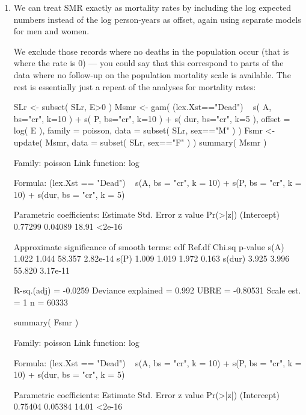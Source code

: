 \begin{enumerate}[resume]

  
  

\item We can treat SMR exactly as mortality rates by including the log
  expected numbers instead of the log person-years as offset, again using
  separate models for men and women. 
 
  We exclude those records where no deaths in the population occur
  (that is where the rate is 0) --- you could say that this correspond
  to parts of the data where no follow-up on the population mortality
  scale is available. The rest is essentially just a repeat of the
  analyses for mortality rates:
\begin{Schunk}
\begin{Sinput}
 SLr <- subset( SLr, E>0 )
 Msmr <- gam( (lex.Xst=="Dead") ~ s(   A, bs="cr", k=10 ) +
                                  s(   P, bs="cr", k=10 ) +
                                  s( dur, bs="cr", k=5 ),
               offset = log( E ),
               family = poisson,
                 data = subset( SLr, sex=="M" ) )
 Fsmr <- update( Msmr, 
                 data = subset( SLr, sex=="F" ) )
 summary( Msmr )
\end{Sinput}
\begin{Soutput}
Family: poisson 
Link function: log 

Formula:
(lex.Xst == "Dead") ~ s(A, bs = "cr", k = 10) + s(P, bs = "cr", 
    k = 10) + s(dur, bs = "cr", k = 5)

Parametric coefficients:
            Estimate Std. Error z value Pr(>|z|)
(Intercept)  0.77299    0.04089   18.91   <2e-16

Approximate significance of smooth terms:
         edf Ref.df Chi.sq  p-value
s(A)   1.022  1.044 58.357 2.82e-14
s(P)   1.009  1.019  1.972    0.163
s(dur) 3.925  3.996 55.820 3.17e-11

R-sq.(adj) =  -0.0259   Deviance explained = 0.992%
UBRE = -0.80531  Scale est. = 1         n = 60333
\end{Soutput}
\begin{Sinput}
 summary( Fsmr )
\end{Sinput}
\begin{Soutput}
Family: poisson 
Link function: log 

Formula:
(lex.Xst == "Dead") ~ s(A, bs = "cr", k = 10) + s(P, bs = "cr", 
    k = 10) + s(dur, bs = "cr", k = 5)

Parametric coefficients:
            Estimate Std. Error z value Pr(>|z|)
(Intercept)  0.75404    0.05384   14.01   <2e-16


\end{Soutput}
\end{Schunk}
\end{enumerate}
